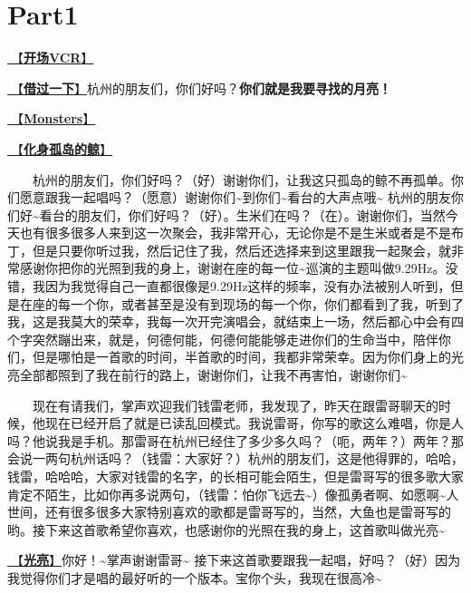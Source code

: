 \documentclass[]{ctexbook}
\begin{document}
\newpage

\section{Part1}\label{hangzhou-20240824-part1}

\hyperref[opening-vcr]{🎥【\textbf{开场VCR}】}

\hyperref[I-will-go-my-way]{🎵【\textbf{借过一下}】}杭州的朋友们，你们好吗？\textbf{你们就是我要寻找的月亮！}

\hyperref[Monsters]{🎵【\textbf{Monsters}】}

\hyperref[hua-shen-gu-dao-de-jing]{🎵【\textbf{化身孤岛的鲸}】}

  杭州的朋友们，你们好吗？（好）谢谢你们，让我这只孤岛的鲸不再孤单。你们愿意跟我一起唱吗？（愿意）谢谢你们\textasciitilde 到你们\textasciitilde 看台的大声点哦\textasciitilde{}
杭州的朋友你们好\textasciitilde 看台的朋友们，你们好吗？（好）。生米们在吗？（在）。谢谢你们，当然今天也有很多很多人来到这一次聚会，我非常开心，无论你是不是生米或者是不是布丁，但是只要你听过我，然后记住了我，然后还选择来到这里跟我一起聚会，就非常感谢你把你的光照到我的身上，谢谢在座的每一位\textasciitilde 巡演的主题叫做9.29Hz。没错，我因为我觉得自己一直都很像是9.29Hz这样的频率，没有办法被别人听到，但是在座的每一个你，或者甚至是没有到现场的每一个你，你们都看到了我，听到了我，这是我莫大的荣幸，我每一次开完演唱会，就结束上一场，然后都心中会有四个字突然蹦出来，就是，何德何能，何德何能能够走进你们的生命当中，陪伴你们，但是哪怕是一首歌的时间，半首歌的时间，我都非常荣幸。因为你们身上的光亮全部都照到了我在前行的路上，谢谢你们，让我不再害怕，谢谢你们\textasciitilde{}

  现在有请我们，掌声欢迎我们钱雷老师，我发现了，昨天在跟雷哥聊天的时候，他现在已经开启了就是已读乱回模式。我说雷哥，你写的歌这么难唱，你是人吗？他说我是手机。那雷哥在杭州已经住了多少多久吗？（呃，两年？）两年？那会说一两句杭州话吗？（钱雷：大家好？）杭州的朋友们，这是他得罪的，哈哈，钱雷，哈哈哈，大家对钱雷的名字，的长相可能会陌生，但是雷哥写的很多歌大家肯定不陌生，比如你再多说两句，（钱雷：怕你飞远去\textasciitilde）像孤勇者啊、如愿啊\textasciitilde 人世间，还有很多很多大家特别喜欢的歌都是雷哥写的，当然，大鱼也是雷哥写的哟。接下来这首歌希望你喜欢，也感谢你的光照在我的身上，这首歌叫做光亮\textasciitilde{}

\hyperref[silver-linings]{🎵【\textbf{光亮}】}你好！\textasciitilde 掌声谢谢雷哥\textasciitilde{}
接下来这首歌要跟我一起唱，好吗？（好）因为我觉得你们才是唱的最好听的一个版本。宝你个头，我现在很高冷\textasciitilde{}
\end{document}
